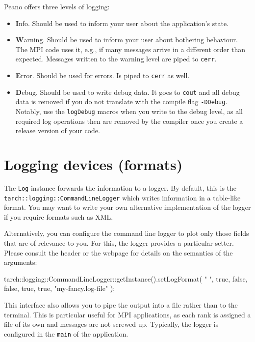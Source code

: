 Peano offers three levels of logging:
\begin{itemize}
  \item {\textbf Info}. Should be used to inform your user about the application's
  state.
  \item {\textbf Warning}. Should be used to inform your user about bothering
  behaviour.
  The MPI code uses it, e.g., if many messages arrive in a different order than
  expected. Messages written to the warning level are piped to
  \texttt{cerr}.
  \item {\textbf Error}. Should be used for errors. Is piped to \texttt{cerr} as
  well.
  \item {\textbf Debug}. Should be used to write debug data. It goes to
  \texttt{cout} and all debug data is removed if you do not translate with the compile flag
  \texttt{-DDebug}. Notably, use the \texttt{logDebug} macros when you write to
  the debug level, as all required log operations then are removed by the
  compiler once you create a release version of your code.
\end{itemize}



\section{Logging devices (formats)}

The \texttt{Log} instance forwards the information to a logger. By default, this
is the \\ \texttt{tarch::logging::CommandLineLogger} which writes information
in a table-like format. You may want to write your own alternative
implementation of the logger if you require formats such as XML.

Alternatively, you can configure the command line logger to plot only those
fields that are of relevance to you.
For this, the logger provides a particular setter.
Please consult the header or the webpage for details on the semantics of the
arguments:
\begin{code}
tarch::logging::CommandLineLogger::getInstance().setLogFormat(
  " ", true, false, false, true, true, "my-fancy.log-file" );
\end{code} 

\noindent
This interface also allows you to pipe the output into a file rather than to the
terminal.
This is particular useful for MPI applications, as each rank is assigned a file
of its own and messages are not screwed up.
Typically, the logger is configured in the \texttt{main} of the application.

